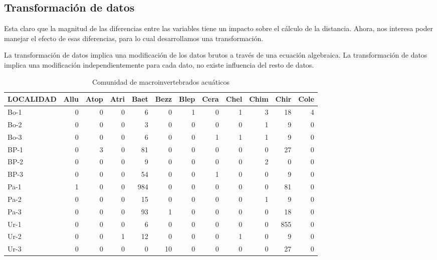 \documentclass[
]{article}
\begin{document}
\hypertarget{transformaciuxf3n-de-datos}{%
\subsection{Transformación de datos}\label{transformaciuxf3n-de-datos}}

Esta claro que la magnitud de las diferencias entre las variables tiene un impacto sobre el cálculo de la distancia. Ahora, nos interesa poder manejar el efecto de esas diferencias, para lo cual desarrollamos una transformación.

La transformación de datos implica una modificación de los datos brutos a través de una ecuación algebraica. La transformación de datos implica una modificación independientemente para cada dato, no existe influencia del resto de datos.

\begin{table}

\caption{\label{tab:unnamed-chunk-16}Comunidad de macroinvertebrados acuáticos}
\centering
\begin{tabular}[t]{l|r|r|r|r|r|r|r|r|r|r|r}
\hline
LOCALIDAD & Allu & Atop & Atri & Baet & Bezz & Blep & Cera & Chel & Chim & Chir & Cole\\
\hline
Bo-1 & 0 & 0 & 0 & 6 & 0 & 1 & 0 & 1 & 3 & 18 & 4\\
\hline
Bo-2 & 0 & 0 & 0 & 3 & 0 & 0 & 0 & 0 & 1 & 9 & 0\\
\hline
Bo-3 & 0 & 0 & 0 & 6 & 0 & 0 & 1 & 1 & 1 & 9 & 0\\
\hline
BP-1 & 0 & 3 & 0 & 81 & 0 & 0 & 0 & 0 & 0 & 27 & 0\\
\hline
BP-2 & 0 & 0 & 0 & 9 & 0 & 0 & 0 & 0 & 2 & 0 & 0\\
\hline
BP-3 & 0 & 0 & 0 & 54 & 0 & 0 & 1 & 0 & 0 & 9 & 0\\
\hline
Pa-1 & 1 & 0 & 0 & 984 & 0 & 0 & 0 & 0 & 0 & 81 & 0\\
\hline
Pa-2 & 0 & 0 & 0 & 15 & 0 & 0 & 0 & 0 & 1 & 9 & 0\\
\hline
Pa-3 & 0 & 0 & 0 & 93 & 1 & 0 & 0 & 0 & 0 & 18 & 0\\
\hline
Ur-1 & 0 & 0 & 0 & 6 & 0 & 0 & 0 & 0 & 0 & 855 & 0\\
\hline
Ur-2 & 0 & 0 & 1 & 12 & 0 & 0 & 0 & 1 & 0 & 9 & 0\\
\hline
Ur-3 & 0 & 0 & 0 & 0 & 10 & 0 & 0 & 0 & 0 & 27 & 0\\
\hline
\end{tabular}
\end{table}
\end{document}
